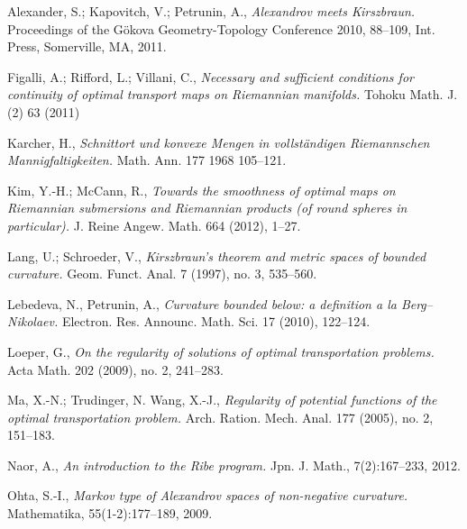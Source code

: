 \documentclass{article}
\begin{document}











\begin{thebibliography}{52}
 Alexander, S.; Kapovitch, V.; Petrunin,  A.,
\emph{Alexandrov meets Kirszbraun.} 
Proceedings of the Gökova Geometry-Topology Conference 2010, 88--109, Int. Press, Somerville, MA, 2011.




 Figalli, A.; Rifford, L.; Villani, C.,
\emph{Necessary and sufficient conditions for continuity of optimal transport maps on Riemannian manifolds.} Tohoku Math. J. (2) 63 (2011)

Karcher, H.,
\emph{Schnittort und konvexe Mengen in vollständigen Riemannschen Mannigfaltigkeiten.}
Math. Ann. 177 1968 105--121.

 Kim, Y.-H.; McCann, R.,
\emph{Towards the smoothness of optimal maps on Riemannian submersions and Riemannian products (of round spheres in particular).}
J. Reine Angew. Math. 664 (2012), 1--27. 

  Lang, U.; Schroeder, V.,
\emph{Kirszbraun's theorem and metric spaces of bounded curvature.}
Geom. Funct. Anal. 7 (1997), no. 3, 535–560. 

 Lebedeva, N., Petrunin, A., \emph{Curvature bounded below: a definition a la Berg--Nikolaev.} Electron. Res. Announc. Math. Sci. 17 (2010), 122--124.

Loeper, G.,
\emph{On the regularity of solutions of optimal transportation problems.}
Acta Math. 202 (2009), no. 2, 241–283. 

  Ma, X.-N.; Trudinger, N.  Wang, X.-J.,
\emph{Regularity of potential functions of the optimal transportation problem.}
Arch. Ration. Mech. Anal. 177 (2005), no. 2, 151--183. 

  Naor, A., \emph{An introduction to the Ribe program.} Jpn. J. Math., 7(2):167--233, 2012.

  Ohta, S.-I.,
\emph{Markov type of Alexandrov spaces of non-negative curvature.} Mathematika, 55(1-2):177--189, 2009.


\end{thebibliography}
\end{document}
